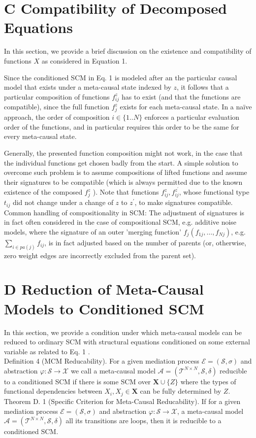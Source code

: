 \documentclass[10pt]{article}
\begin{document}
\section*{C Compatibility of Decomposed Equations}
In this section, we provide a brief discussion on the existence and compatibility of functions $X$ as considered in Equation 1.

Since the conditioned SCM in Eq. 1 is modeled after an the particular causal model that exists under a meta-causal state indexed by $z$, it follows that a particular composition of functions $f_{i j}^{z}$ has to exist (and that the functions are compatible), since the full function $f_{j}^{z}$ exists for each meta-causal state. In a naïve approach, the order of composition $i \in\{1 . . N\}$ enforces a particular evaluation order of the functions, and in particular requires this order to be the same for every meta-causal state.

Generally, the presented function composition might not work, in the case that the individual functions get chosen badly from the start. A simple solution to overcome such problem is to assume compositions of lifted functions and assume their signatures to be compatible (which is always permitted due to the known existence of the composed $f_{j}^{z}$ ). Note that functions $f_{i j}^{z}, f_{i j}^{z^{\prime}}$, whose functional type $t_{i j}$ did not change under a change of $z$ to $z^{\prime}$, to make signatures compatible.\\
Common handling of compositionality in SCM: The adjustment of signatures is in fact often considered in the case of compositional SCM, e.g. additive noise models, where the signature of an outer 'merging function' $f_{j}\left(f_{1 j}, \ldots, f_{N j}\right)$, e.g. $\sum_{i \in p a(j)} f_{i j}$, is in fact adjusted based on the number of parents (or, otherwise, zero weight edges are incorrectly excluded from the parent set).

\section*{D Reduction of Meta-Causal Models to Conditioned SCM}
In this section, we provide a condition under which meta-causal models can be reduced to ordinary SCM with structural equations conditioned on some external variable as related to Eq. 1 .\\
Definition 4 (MCM Reducability). For a given mediation process $\mathcal{E}=(\mathcal{S}, \sigma)$ and abstraction $\varphi: \mathcal{S} \rightarrow \mathcal{X}$ we call a meta-causal model $\mathcal{A}=\left(\mathcal{T}^{N \times N}, \mathcal{S}, \delta\right)$ reducible to a conditioned SCM if there is some SCM over $\mathbf{X} \cup\{Z\}$ where the types of functional dependencies between $X_{i}, X_{j} \in \mathbf{X}$ can be fully determined by $Z$.\\
Theorem D. 1 (Specific Criterion for Meta-Causal Reducability). If for a given mediation process $\mathcal{E}=(\mathcal{S}, \sigma)$ and abstraction $\varphi: \mathcal{S} \rightarrow \mathcal{X}$, a meta-causal model $\mathcal{A}=\left(\mathcal{T}^{N \times N}, \mathcal{S}, \delta\right)$ all its transitions are loops, then it is reducible to a conditioned SCM.
\end{document}
